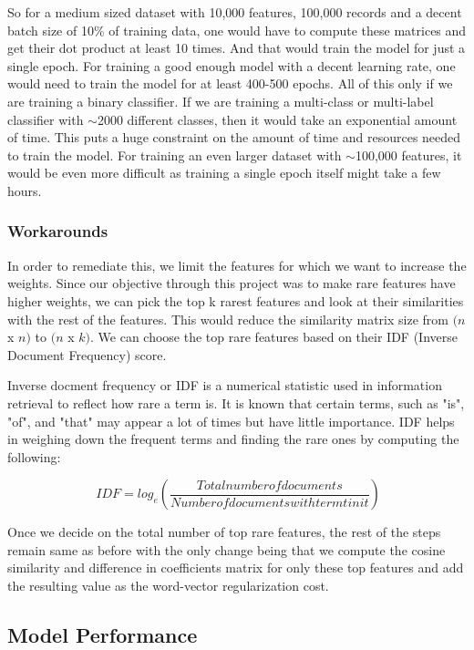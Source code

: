 So for a medium sized dataset with 10,000 features, 100,000 records and a decent batch size of 10\% of training data, one would have to compute these matrices and get their dot product at least 10 times. And that would train the model for just a single epoch. For training a good enough model with a decent learning rate, one would need to train the model for at least 400-500 epochs. All of this only if we are training a binary classifier. If we are training a multi-class or multi-label classifier with $\sim$2000 different classes, then it would take an exponential amount of time. This puts a huge constraint on the amount of time and resources needed to train the model. For training an even larger dataset with $\sim$100,000 features, it would be even more difficult as training a single epoch itself might take a few hours.

\subsubsection{Workarounds}

In order to remediate this, we limit the features for which we want to increase the weights. Since our objective through this project was to make rare features have higher weights, we can pick the top k rarest features and look at their similarities with the rest of the features. This would reduce the similarity matrix size from $(n$ x $n)$ to $(n$ x $k)$. We can choose the top rare features based on their IDF (Inverse Document Frequency) score.

Inverse docment frequency or IDF is a numerical statistic used in information retrieval to reflect how rare a term is. It is known that certain terms, such as "is", "of", and "that" may appear a lot of times but have little importance. IDF helps in weighing down the frequent terms and finding the rare ones by computing the following:

\begin{equation}
\ IDF = log_e (\frac{Total number of documents}{Number of documents with term t in it})
\end{equation}

Once we decide on the total number of top rare features, the rest of the steps remain same as before with the only change being that we compute the cosine similarity and difference in coefficients matrix for only these top features and add the resulting value as the word-vector regularization cost.

\newpage
\subsection{Model Performance}

